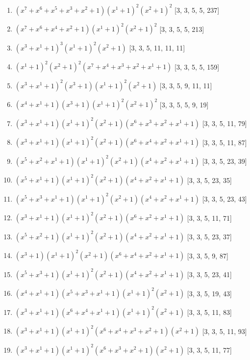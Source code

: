 \documentclass[10pt,twocolumn]{article}
\begin{document}
\begin{enumerate}
\item $(x^{7} + x^{6} + x^{5} + x^{3} + x^{2} + 1)(x^{1} + 1)^{2}(x^{2} + 1)^{2}$  [3, 3, 5, 5, 237]
\item $(x^{7} + x^{6} + x^{4} + x^{2} + 1)(x^{1} + 1)^{2}(x^{2} + 1)^{2}$  [3, 3, 5, 5, 213]
\item $(x^{3} + x^{1} + 1)^{3}(x^{1} + 1)^{2}(x^{2} + 1)$  [3, 3, 5, 11, 11, 11]
\item $(x^{1} + 1)^{2}(x^{2} + 1)^{2}(x^{7} + x^{4} + x^{3} + x^{2} + x^{1} + 1)$  [3, 3, 5, 5, 159]
\item $(x^{3} + x^{1} + 1)^{2}(x^{3} + 1)(x^{1} + 1)^{2}(x^{2} + 1)$  [3, 3, 5, 9, 11, 11]
\item $(x^{4} + x^{1} + 1)(x^{3} + 1)(x^{1} + 1)^{2}(x^{2} + 1)^{2}$  [3, 3, 5, 5, 9, 19]
\item $(x^{3} + x^{1} + 1)(x^{1} + 1)^{2}(x^{2} + 1)(x^{6} + x^{3} + x^{2} + x^{1} + 1)$  [3, 3, 5, 11, 79]
\item $(x^{3} + x^{1} + 1)(x^{1} + 1)^{2}(x^{2} + 1)(x^{6} + x^{4} + x^{2} + x^{1} + 1)$  [3, 3, 5, 11, 87]
\item $(x^{5} + x^{2} + x^{1} + 1)(x^{1} + 1)^{2}(x^{2} + 1)(x^{4} + x^{2} + x^{1} + 1)$  [3, 3, 5, 23, 39]
\item $(x^{5} + x^{1} + 1)(x^{1} + 1)^{2}(x^{2} + 1)(x^{4} + x^{2} + x^{1} + 1)$  [3, 3, 5, 23, 35]
\item $(x^{5} + x^{3} + x^{1} + 1)(x^{1} + 1)^{2}(x^{2} + 1)(x^{4} + x^{2} + x^{1} + 1)$  [3, 3, 5, 23, 43]
\item $(x^{3} + x^{1} + 1)(x^{1} + 1)^{2}(x^{2} + 1)(x^{6} + x^{2} + x^{1} + 1)$  [3, 3, 5, 11, 71]
\item $(x^{5} + x^{2} + 1)(x^{1} + 1)^{2}(x^{2} + 1)(x^{4} + x^{2} + x^{1} + 1)$  [3, 3, 5, 23, 37]
\item $(x^{3} + 1)(x^{1} + 1)^{2}(x^{2} + 1)(x^{6} + x^{4} + x^{2} + x^{1} + 1)$  [3, 3, 5, 9, 87]
\item $(x^{5} + x^{3} + 1)(x^{1} + 1)^{2}(x^{2} + 1)(x^{4} + x^{2} + x^{1} + 1)$  [3, 3, 5, 23, 41]
\item $(x^{4} + x^{1} + 1)(x^{5} + x^{3} + x^{1} + 1)(x^{1} + 1)^{2}(x^{2} + 1)$  [3, 3, 5, 19, 43]
\item $(x^{3} + x^{1} + 1)(x^{6} + x^{4} + x^{1} + 1)(x^{1} + 1)^{2}(x^{2} + 1)$  [3, 3, 5, 11, 83]
\item $(x^{3} + x^{1} + 1)(x^{1} + 1)^{2}(x^{6} + x^{4} + x^{3} + x^{2} + 1)(x^{2} + 1)$  [3, 3, 5, 11, 93]
\item $(x^{3} + x^{1} + 1)(x^{1} + 1)^{2}(x^{6} + x^{3} + x^{2} + 1)(x^{2} + 1)$  [3, 3, 5, 11, 77]

\end{enumerate}
\end{document}
